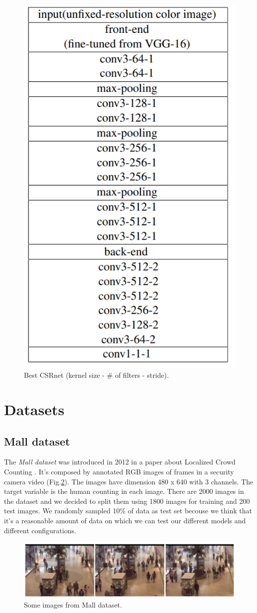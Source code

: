 \documentclass[10pt,twocolumn,letterpaper]{article}
\begin{document}
\begin{figure}[h!]
	\includegraphics[width=0.5\columnwidth]{pics/CSRnet.png}
	\centering
	\caption{Best CSRnet  (kernel size - \# of filters - stride).}
	\centering
	\label{fig:CSRnet}
\end{figure}



\section{Datasets}
\subsection{Mall dataset}

The \textit{Mall dataset} was introduced in 2012 in a paper about Localized Crowd Counting \cite{chen2012feature}. It's composed by annotated RGB images of frames in a security camera video (Fig.\ref{fig:security}). The images have dimension 480 x 640 with 3 channels. The target variable is the human counting in each image. There are 2000 images in the dataset and we decided to split them using 1800 images for training and 200 test images. We randomly sampled 10\% of data as test set becouse we think that it's a reasonable amount of data on which we can test our different models and different configurations. 


\begin{figure}[h!]%
	\includegraphics[width=1\columnwidth]{pics/securitycameraimages.png}
	\centering
	\caption{Some images from Mall dataset.}
	\centering
	\label{fig:security}
\end{figure}
\end{document}
